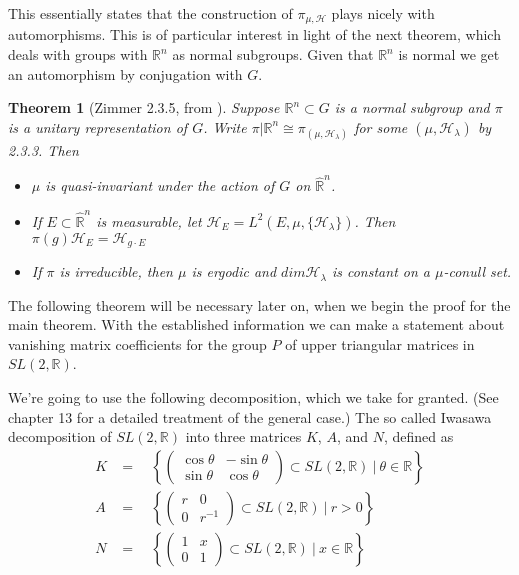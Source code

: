 \documentclass[
  12pt
]{article}
\newtheorem{thm}{Theorem}[section]
\theoremstyle{plain}
\newcommand{\G}{\ensuremath{G}\xspace}
\newcommand{\bbr}{\ensuremath{\mathbb{R}}\xspace}
\newcommand{\hilb}{\ensuremath{\mathscr{H}}\xspace}
\newcommand{\sltr}{\ensuremath{SL(2, \mathbb{R})}\xspace}
\begin{document}
  This essentially states that the construction of $\pi_{\mu, \hilb}$ plays
  nicely with automorphisms. This is of particular interest in light of the
  next theorem, which deals with groups with $\bbr^n$ as normal subgroups. Given
  that $\bbr^n$ is normal we get an automorphism by conjugation with \G.

  \begin{thm}[Zimmer 2.3.5, from  \cite{mackey76}]
    \label{thm:2.3.5}
    Suppose $\mathbb{R}^n \subset G$ is a normal subgroup and $\pi$ is a unitary representation of $G$.
    Write $\pi | \mathbb{R}^n \cong \pi_{(\mu, \mathscr{H}_{\lambda})}$ for some
    $(\mu, \mathscr{H}_{\lambda})$ by 2.3.3. Then  
    \begin{itemize}
      \item $\mu$ is quasi-invariant under the action of $G$ on $\hat{\mathbb{R}}^n$. 
      \item If $E \subset \hat{\mathbb{R}}^n$ is measurable, let
        $\mathscr{H}_E = L^2(E, \mu, \{\mathscr{H}_{\lambda}\})$.
        Then $\pi(g)\mathscr{H}_E = \mathscr{H}_{g \cdot E}$
      \item If $\pi$ is irreducible, then $\mu$ is ergodic and $dim\mathscr{H}_{\lambda}$ is
        constant on a $\mu$-conull set.
    \end{itemize}
  \end{thm}

  The following theorem will be necessary later on, when we begin the proof for
  the main theorem. With the established information we can make a statement
  about vanishing matrix coefficients for the group $P$ of upper triangular
  matrices in \sltr.


  We're going to use the following decomposition, which we take for
  granted. (See \citeauthor{Hilgert2012}\cite{Hilgert2012} chapter 13 for a detailed treatment of the general case.)
  The so called Iwasawa decomposition of $SL(2, \mathbb{R})$ into three
  matrices $K$, $A$, and $N$, defined as
  \begin{align}
  K & =\quad \left\{ \begin{pmatrix} \cos\theta & -\sin\theta \\ \sin\theta & \cos\theta\end{pmatrix} \subset SL(2, \mathbb{R})  \ | \ \theta \in \mathbb{R} \right\} \\
  A & =\quad \left\{ \begin{pmatrix} r & 0 \\ 0 & r^{-1} \end{pmatrix} \subset SL(2, \mathbb{R})  \ | \ r > 0 \right\} \\
  N & =\quad \left\{ \begin{pmatrix} 1 & x \\ 0 & 1 \end{pmatrix} \subset SL(2, \mathbb{R})  \ | \ x \in \mathbb{R} \right\}\\
  \end{align}
\end{document}
